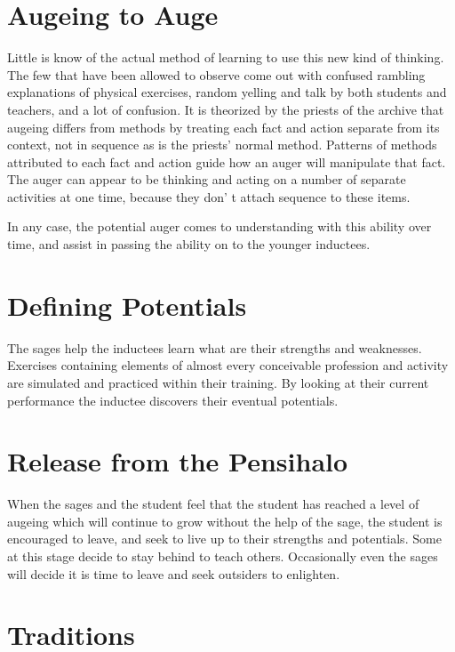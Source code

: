 \begin{multicols*}{2}
\section{Augeing to Auge}

Little is know of the actual method of learning to use this new kind of thinking. The few that have been allowed to observe come out with confused rambling explanations of physical exercises, random yelling and talk by both students and teachers, and a lot of confusion. It is theorized by the
priests of the archive that augeing differs from methods by treating each fact and action separate from its context, not in sequence as is the priests'  normal method. Patterns of methods attributed to each fact and action guide how an auger will manipulate that fact. The auger can appear to be thinking and acting on a number of separate activities at one time, because they don' t attach sequence to these items.

In any case, the potential auger comes to understanding with this ability over time, and assist in passing the ability on to the younger inductees.

\section{Defining Potentials}

The sages help the inductees learn what are their strengths and weaknesses. Exercises containing elements of almost every conceivable profession and activity are simulated and practiced within their training. By looking at their current performance the inductee discovers their eventual potentials.

\section{Release from the Pensihalo}

When the sages and the student feel that the student has reached a level of augeing which will continue to grow without the help of the sage, the student is encouraged to leave, and seek to live up to their strengths and potentials. Some at this stage decide to stay behind to teach others. Occasionally even the sages will decide it is time to leave and seek outsiders to enlighten.

\section{Traditions}


\end{multicols*}
